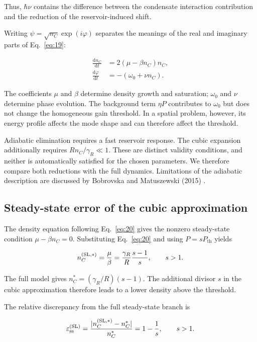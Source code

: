 \documentclass[12pt,a4paper]{article}
\begin{document}
Thus, $\hbar \nu$ contains the difference between the condensate interaction contribution and the reduction of the reservoir-induced shift.

Writing $\psi=\sqrt{n_{C}}\exp(i \varphi)$ separates the meanings of the real and imaginary parts of Eq.~\eqref{eq:19}:

\[
\begin{aligned}\frac{\mathrm dn_C}{\mathrm dt}&=2(\mu-\beta n_C)n_C,\\\frac{\mathrm d\varphi}{\mathrm dt}&=-(\omega_0+\nu n_C).\end{aligned}
\]

The coefficients $\mu$ and $\beta$ determine density growth and saturation; $\omega_{0}$ and $\nu$ determine phase evolution. The background term $\eta P$ contributes to $\omega_{0}$ but does not change the homogeneous gain threshold. In a spatial problem, however, its energy profile affects the mode shape and can therefore affect the threshold.

Adiabatic elimination requires a fast reservoir response. The cubic expansion additionally requires $R n_{C}/\gamma_{R}\ll1$. These are distinct validity conditions, and neither is automatically satisfied for the chosen parameters. We therefore compare both reductions with the full dynamics. Limitations of the adiabatic description are discussed by Bobrovska and Matuszewski (2015) \cite{ref2}.

\subsection{Steady-state error of the cubic approximation}\label{sec:4.4}

The density equation following Eq.~\eqref{eq:20} gives the nonzero steady-state condition $\mu-\beta n_{C}=0$. Substituting Eq.~\eqref{eq:20} and using $P=s P_{\mathrm{th}}$ yields

\begin{equation}\label{eq:21}
n_C^{(\rm SL,*)}=\frac{\mu}{\beta}=\frac{\gamma_R}{R}\frac{s-1}{s},\qquad s>1.\end{equation}

The full model gives $n_{C}^{*}=(\gamma_{R}/R)(s-1)$. The additional divisor $s$ in the cubic approximation therefore leads to a lower density above the threshold.

The relative discrepancy from the full steady-state branch is

\begin{equation}\label{eq:22}
\varepsilon_{\rm ss}^{(\rm SL)}=\frac{|n_C^{(\rm SL,*)}-n_C^*|}{n_C^*}=1-\frac1s,\qquad s>1.\end{equation}
\end{document}

